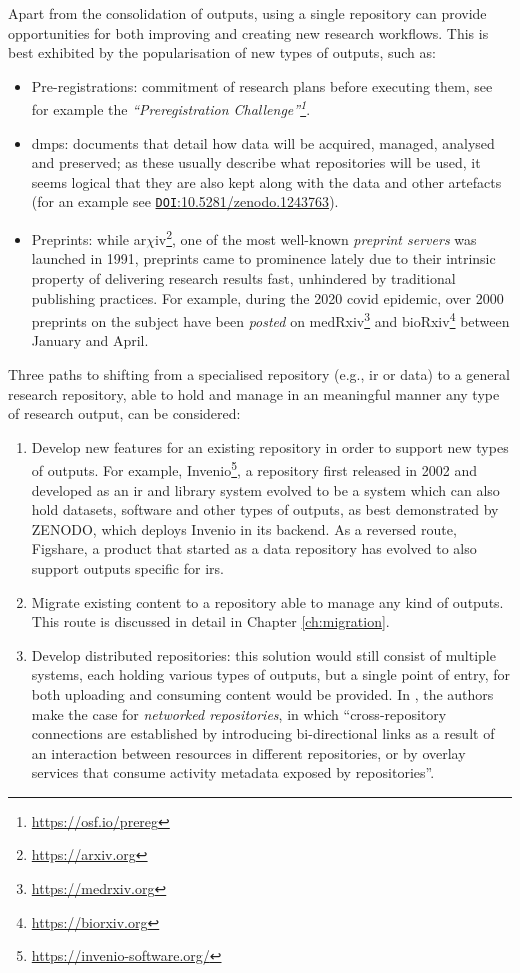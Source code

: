 Apart from the consolidation of outputs, using a single repository can provide opportunities for both improving and creating new research workflows. This is best exhibited by the popularisation of new types of outputs, such as:
\begin{itemize}
    \item Pre-registrations: commitment of research plans before executing them, see for example the \emph{``Preregistration Challenge''\footnote{\url{https://osf.io/prereg}}}.
    \item \glspl{dmp}: documents that detail how data will be acquired, managed, analysed and preserved; as these usually describe what repositories will be used,  it seems logical that they are also kept along with the data and other artefacts (for an example see \href{https://doi.org/10.5281/zenodo.1243763}{\texttt{DOI}:10.5281/zenodo.1243763}).
    \item Preprints: while ar$\chi$iv\footnote{\url{https://arxiv.org}}, one of the most well-known \emph{preprint servers} was launched in 1991, preprints came to prominence lately due to their intrinsic property of delivering research results fast, unhindered by traditional publishing practices. For example, during the 2020 \gls{covid} epidemic, over 2000 preprints on the subject have been \emph{posted} on medRxiv\footnote{\url{https://medrxiv.org}} and bioRxiv\footnote{\url{https://biorxiv.org}} between January and April.
\end{itemize}

Three paths to shifting from a specialised repository (e.g., \gls{ir} or data) to a general research repository, able to hold and manage in an meaningful manner any type of research output, can be considered: 
\begin{enumerate}
    \item Develop new features for an existing repository in order to support new types of outputs. For example, Invenio\footnote{\url{https://invenio-software.org/}}, a repository first released in 2002 and developed as an \gls{ir} and library system evolved to be a system which can also hold datasets\cite{invenioabout}, software and other types of outputs, as best demonstrated by ZENODO, which deploys Invenio in its backend. As a reversed route, Figshare, a product that started as a data repository has evolved to also support outputs specific for \glspl{ir}\cite{figntro}.
    \item Migrate existing content to a repository able to manage any kind of outputs. This route is discussed in detail in Chapter \ref{ch:migration}.
    \item Develop distributed repositories: this solution would still consist of multiple systems, each holding various types of outputs, but a single point of entry, for both uploading and consuming content would be provided. In \cite{coar}, the authors make the case for \emph{networked repositories}, in which \emph{}``cross-repository connections are established by introducing bi-directional links as a result of an interaction between resources in different repositories, or by overlay services that consume activity metadata exposed by repositories''. 
\end{enumerate}

